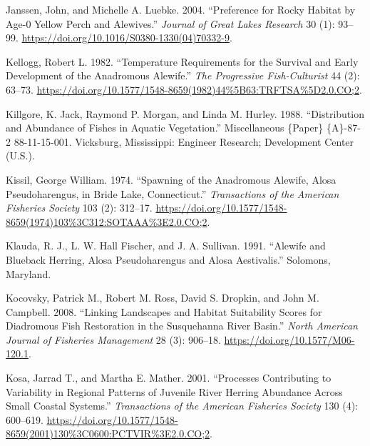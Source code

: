 \documentclass[
]{book}
\newlength{\cslhangindent}
\newlength{\cslentryspacingunit} %
\newenvironment{CSLReferences}[2] %
 {%
  \setlength{\parindent}{0pt}
  \ifodd #1
  \let\oldpar\par
  \def\par{\hangindent=\cslhangindent\oldpar}
  \fi
  \setlength{\parskip}{#2\cslentryspacingunit}
 }%
 {}
\begin{document}
\begin{CSLReferences}{1}{0}
\leavevmode{}%
Janssen, John, and Michelle A. Luebke. 2004. {``Preference for {Rocky} {Habitat} by {Age}-0 {Yellow} {Perch} and {Alewives}.''} \emph{Journal of Great Lakes Research} 30 (1): 93--99. \url{https://doi.org/10.1016/S0380-1330(04)70332-9}.

\leavevmode{}%
Kellogg, Robert L. 1982. {``Temperature {Requirements} for the {Survival} and {Early} {Development} of the {Anadromous} {Alewife}.''} \emph{The Progressive Fish-Culturist} 44 (2): 63--73. \url{https://doi.org/10.1577/1548-8659(1982)44\%5B63:TRFTSA\%5D2.0.CO;2}.

\leavevmode{}%
Killgore, K. Jack, Raymond P. Morgan, and Linda M. Hurley. 1988. {``Distribution and {Abundance} of {Fishes} in {Aquatic} {Vegetation}.''} Miscellaneous \{Paper\} \{A\}-87-2 88-11-15-001. Vicksburg, Mississippi: Engineer Research; Development Center (U.S.).

\leavevmode{}%
Kissil, George William. 1974. {``Spawning of the {Anadromous} {Alewife}, {Alosa} Pseudoharengus, in {Bride} {Lake}, {Connecticut}.''} \emph{Transactions of the American Fisheries Society} 103 (2): 312--17. \url{https://doi.org/10.1577/1548-8659(1974)103\%3C312:SOTAAA\%3E2.0.CO;2}.

\leavevmode{}%
Klauda, R. J., L. W. Hall Fischer, and J. A. Sullivan. 1991. {``Alewife and {Blueback} {Herring}, {Alosa} Pseudoharengus and {Alosa} Aestivalis.''} Solomons, Maryland.

\leavevmode{}%
Kocovsky, Patrick M., Robert M. Ross, David S. Dropkin, and John M. Campbell. 2008. {``Linking {Landscapes} and {Habitat} {Suitability} {Scores} for {Diadromous} {Fish} {Restoration} in the {Susquehanna} {River} {Basin}.''} \emph{North American Journal of Fisheries Management} 28 (3): 906--18. \url{https://doi.org/10.1577/M06-120.1}.

\leavevmode{}%
Kosa, Jarrad T., and Martha E. Mather. 2001. {``Processes {Contributing} to {Variability} in {Regional} {Patterns} of {Juvenile} {River} {Herring} {Abundance} Across {Small} {Coastal} {Systems}.''} \emph{Transactions of the American Fisheries Society} 130 (4): 600--619. \url{https://doi.org/10.1577/1548-8659(2001)130\%3C0600:PCTVIR\%3E2.0.CO;2}.


\end{CSLReferences}
\end{document}
